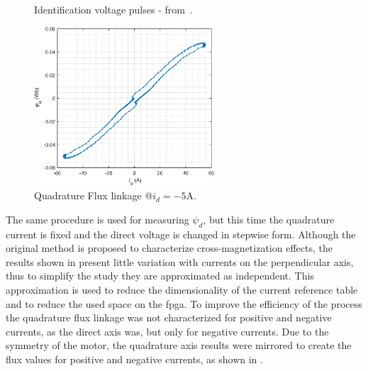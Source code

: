 \begin{figure}[!htb]
	\begin{subfigmatrix}{2}
	\end{subfigmatrix}
	\caption{Identification voltage pulses - from~\citet{Stumberger:saturation_model:2003}.}
	\label{fig:stepwise}%
\end{figure}
\begin{figure}[!htb]
	\centering
	\includegraphics[width=0.6\textwidth]{Figures/id-5__vq-30.eps}
	\caption[Quadrature Flux linkage @$i_d = -5$A.]{Quadrature Flux linkage @$i_d = -5$A.}
	\label{fig:flux_linkage_curve} %
\end{figure}

The same procedure is used for measuring $\psi_d$, but this time the quadrature current is fixed and the direct voltage is changed in stepwise form. Although the original method is proposed to characterize cross-magnetization effects, the results shown in  present little variation with currents on the perpendicular axis, thus to simplify the study they are approximated as independent. This approximation is used to reduce the dimensionality of the current reference table and to reduce the used space on the \gls{fpga}. To improve the efficiency of the process the quadrature flux linkage was not characterized for positive and negative currents, as the direct axis was, but only for negative currents. Due to the symmetry of the motor, the quadrature axis results were mirrored to create the flux values for positive and negative currents, as shown in .

